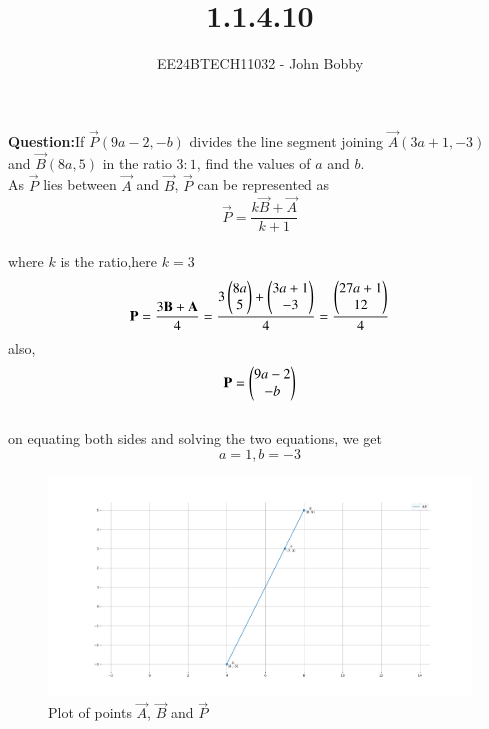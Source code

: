 \documentclass[journal]{IEEEtran}
\begin{document}

\vspace{3cm}
\title{1.1.4.10}
\author{EE24BTECH11032 - John Bobby
}
{\let\newpage\relax\maketitle}

\renewcommand{\thefigure}{\theenumi}
\renewcommand{\thetable}{\theenumi}
\setlength{\intextsep}{10pt} %


\renewcommand{\thetable}{\theenumi}
 \textbf{Question:}If $\vec{P}(9a-2,-b)$ divides the line segment joining $\vec{A}(3a+1,-3)$ and $\vec{B}(8a,5)$  
		in the ratio $3:1$, find the values of $a$ and $b$.\\
 
 \solution As $\vec{P}$ lies between $\vec{A}$ and $\vec{B}$, $\vec{P}$ can be represented as \\ 
		$$\vec{P}=\frac{k\vec{B}+\vec{A}}{k+1}$$ \\
		where $k$ is the ratio,here $k=3$\\
		$$\mathbf{P}=\frac{3\mathbf{B}+\mathbf{A}}{4}=\frac{3\begin{pmatrix}8a\\5\end{pmatrix}+\begin{pmatrix}3a+1\\-3\end{pmatrix}}{4}=\frac{\begin{pmatrix}27a+1\\12\end{pmatrix}}{4}$$
		also, $$\mathbf{P}=\begin{pmatrix}9a-2\\-b\end{pmatrix}$$\\
		on equating both sides and solving the two equations, we get \\
		$$a=1, b=-3$$


		\begin{figure}[h!]
                \centering
               \includegraphics[width=0.7\linewidth]{Figs/Fig1.png}
			\caption{Plot of points $\vec{A}$, $\vec{B}$ and $\vec{P}$}
               \label{stemplot}
               \end{figure}
\end{document}
